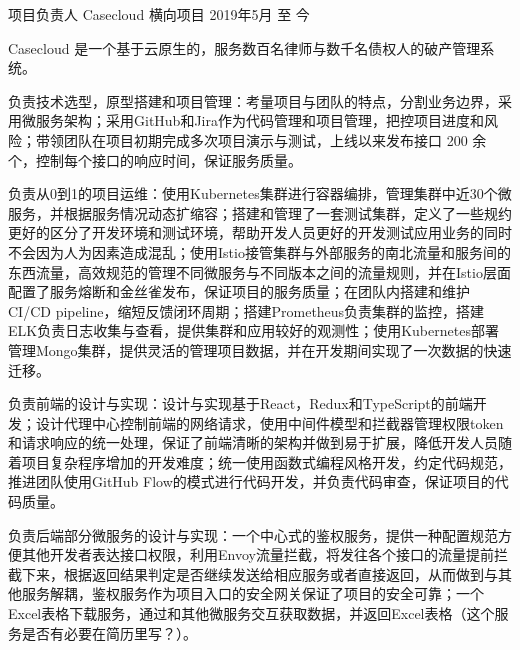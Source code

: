 

\begin{cventries}

  \cventry
    {项目负责人} %
    {Casecloud} %
    {横向项目} %
    {2019年5月 至 今} %
    {
      \begin{cvitems} %
        \setlength\itemsep{1mm}
        \item {Casecloud 是一个基于云原生的，服务数百名律师与数千名债权人的破产管理系统。}
        \item {负责技术选型，原型搭建和项目管理：考量项目与团队的特点，分割业务边界，采用微服务架构；采用GitHub和Jira作为代码管理和项目管理，把控项目进度和风险；带领团队在项目初期完成多次项目演示与测试，上线以来发布接口 200 余个，控制每个接口的响应时间，保证服务质量。}
        \item {负责从0到1的项目运维：使用Kubernetes集群进行容器编排，管理集群中近30个微服务，并根据服务情况动态扩缩容；搭建和管理了一套测试集群，定义了一些规约更好的区分了开发环境和测试环境，帮助开发人员更好的开发测试应用业务的同时不会因为人为因素造成混乱；使用Istio接管集群与外部服务的南北流量和服务间的东西流量，高效规范的管理不同微服务与不同版本之间的流量规则，并在Istio层面配置了服务熔断和金丝雀发布，保证项目的服务质量；在团队内搭建和维护 CI/CD pipeline，缩短反馈闭环周期；搭建Prometheus负责集群的监控，搭建ELK负责日志收集与查看，提供集群和应用较好的观测性；使用Kubernetes部署管理Mongo集群，提供灵活的管理项目数据，并在开发期间实现了一次数据的快速迁移。}
        \item {负责前端的设计与实现：设计与实现基于React，Redux和TypeScript的前端开发；设计代理中心控制前端的网络请求，使用中间件模型和拦截器管理权限token和请求响应的统一处理，保证了前端清晰的架构并做到易于扩展，降低开发人员随着项目复杂程序增加的开发难度；统一使用函数式编程风格开发，约定代码规范，推进团队使用GitHub Flow的模式进行代码开发，并负责代码审查，保证项目的代码质量。}
        \item {负责后端部分微服务的设计与实现：一个中心式的鉴权服务，提供一种配置规范方便其他开发者表达接口权限，利用Envoy流量拦截，将发往各个接口的流量提前拦截下来，根据返回结果判定是否继续发送给相应服务或者直接返回，从而做到与其他服务解耦，鉴权服务作为项目入口的安全网关保证了项目的安全可靠；一个Excel表格下载服务，通过和其他微服务交互获取数据，并返回Excel表格（这个服务是否有必要在简历里写？）。}
      \end{cvitems}
    }


\end{cventries}
